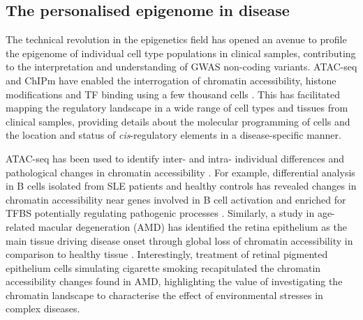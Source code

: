 \subsection{The personalised epigenome in disease}

The technical revolution in the epigenetics field has opened an avenue to profile the epigenome of individual cell type populations in clinical samples, contributing to the interpretation and understanding of GWAS non-coding variants. ATAC-seq and ChIPm have enabled the interrogation of chromatin accessibility, histone modifications and TF binding using a few thousand cells \parencite{Buenrostro2013, Schmidl2015}. This has facilitated mapping the regulatory landscape in a wide range of cell types and tissues from clinical samples, providing details about the molecular programming of cells and the location and status of \textit{cis}-regulatory elements in a disease-specific manner. 

ATAC-seq has been used to identify inter- and intra- individual differences and pathological changes in chromatin accessibility \parencite{Qu2015}. For example, differential analysis in B cells isolated from SLE patients and healthy controls has revealed changes in chromatin accessibility near genes involved in B cell activation and enriched for TFBS potentially regulating pathogenic processes \parencite{Scharer2016}. Similarly, a study in age-related macular degeneration (AMD) has identified the retina epithelium as the main tissue driving disease onset through global loss of chromatin accessibility in comparison to healthy tissue \parencite{Wang2018}. Interestingly, treatment of retinal pigmented epithelium cells simulating cigarette smoking recapitulated the chromatin accessibility changes found in AMD, highlighting the value of investigating the chromatin landscape to characterise the effect of environmental stresses in complex diseases. %

